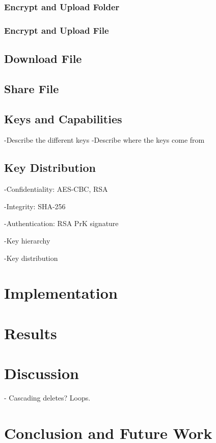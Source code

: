 \documentclass[english,12pt,a4paper]{book}
\begin{document}
\subsection{Encrypt and Upload Folder}

\subsection{Encrypt and Upload File}

\section{Download File}

\section{Share File}

\section{Keys and Capabilities}
\label{sec:CS:KAC}
-Describe the different keys
-Describe where the keys come from

\section{Key Distribution}
\label{sec:CS:KD}
{
-Confidentiality: AES-CBC, RSA

-Integrity: SHA-256

-Authentication: RSA PrK signature

-Key hierarchy

-Key distribution
}

\chapter{Implementation}

\chapter{Results}

\chapter{Discussion}

- Cascading deletes? Loops.

\chapter{Conclusion and Future Work}




\appendix
\appendixpage
\addappheadtotoc
\end{document}
